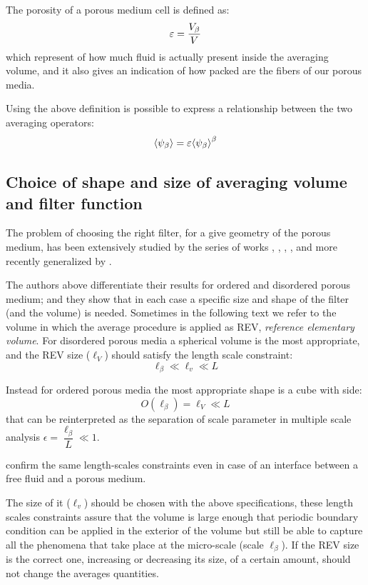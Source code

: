 The porosity of a porous medium cell is defined as:
\begin{equation}
	\varepsilon = \dfrac{V_\beta}{V}
	\label{eq:porosity}
\end{equation}
which represent of how much fluid is actually present inside the averaging volume, and it also gives an indication of how packed are the fibers of our porous media.

Using the above definition is possible to express a relationship between the two averaging operators:
\begin{equation}
	{\left< \psi_{\beta} \right>} =  \varepsilon {\left< \psi_{\beta} \right>}^{\beta}
	\label{eq:means_vs_meani}
\end{equation}

\subsection{Choice of shape and size of averaging volume and filter function}
\label{ch:filter}

The problem of choosing the right filter, for a give geometry of the porous medium, has been extensively studied by the series of works \citet{quintard1994transport1}, \citet{quintard1994transport2}, \citet{quintard1994transport3}, \citet{quintard1994transport4}, \citet{quintard1994transport5} and more recently generalized by \citet{davit2017technical}.

The authors above differentiate their results for ordered and disordered porous medium; and they show that in each case a specific size and shape of the filter (and the volume) is needed.
Sometimes in the following text we refer to the volume in which the average procedure is applied as REV, \textit{reference elementary volume}.
For disordered porous media a spherical volume is the most appropriate, and the REV size ($\ell_V$) should satisfy the length scale constraint:
$$
\ell_{\beta} \ll \ell_v \ll L
$$

Instead for ordered porous media the most appropriate shape is a cube with side:
$$
O(\ell_{\beta}) = \ell_V \ll L
$$
that can be reinterpreted as the separation of scale parameter in multiple scale analysis $\epsilon = \dfrac{\ell_{\beta}}{L} \ll 1$.

\citet{ochoa1995momentum} confirm the same length-scales constraints even in case of an interface between a free fluid and a porous medium.

The size of it ($\ell_v$) should be chosen with the above specifications, these length scales constraints assure that the volume is large enough that periodic boundary condition can be applied in the exterior of the volume but still be able to capture all the phenomena that take place at the micro-scale (scale $\ell_{\beta}$).
If the REV size is the correct one, increasing or decreasing its size, of a certain amount, should not change the averages quantities.


